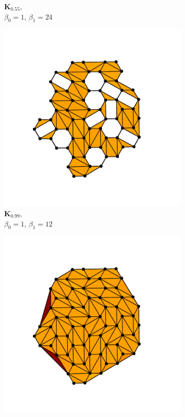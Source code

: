 \begin{figure}[tb]
\begin{subfigure}[b]{0.22\textwidth}
         \caption{$\mathbf{K}_{0.55}$,\\ $\beta_0=1$, $\beta_1=24$}
         \label{fig:phexb}
     \end{subfigure}
     \hfill
     \begin{subfigure}[b]{0.22\textwidth}
         \centering
         \includegraphics[width=\textwidth]{./figures/ph/ph_ex_crys_20.pdf}
         \caption{$\mathbf{K}_{0.99}$,\\ $\beta_0=1$, $\beta_1=12$}
         \label{fig:phexc}
     \end{subfigure}
     \hfill
     \begin{subfigure}[b]{0.22\textwidth}
         \centering
         \includegraphics[width=\textwidth]{./figures/ph/ph_ex_crys_inf.pdf}

\end{subfigure}
\end{figure}
